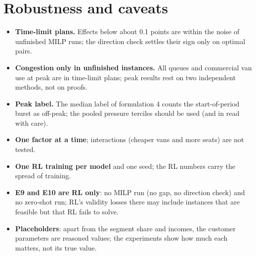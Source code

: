 \section{Robustness and caveats}
\begin{itemize}
  \item \textbf{Time-limit plans.} Effects below about 0.1 points are within the noise of unfinished MILP runs; the direction check settles their sign only on optimal pairs.
  \item \textbf{Congestion only in unfinished instances.} All queues and commercial van use at peak are in time-limit plans; peak results rest on two independent methods, not on proofs.
  \item \textbf{Peak label.} The median label of formulation 4 counts the start-of-period burst as off-peak; the pooled pressure terciles should be used (and  in  read with care).
  \item \textbf{One factor at a time}; interactions (cheaper vans and more seats) are not tested.
  \item \textbf{One RL training per model} and one seed; the RL numbers carry the spread of training.
  \item \textbf{E9 and E10 are RL only}: no MILP run (no gap, no direction check) and no zero-shot run; RL's validity losses there may include instances that are feasible but that RL fails to solve.
  \item \textbf{Placeholders}: apart from the segment share and incomes, the customer parameters are reasoned values; the experiments show how much each matters, not its true value.
\end{itemize}

